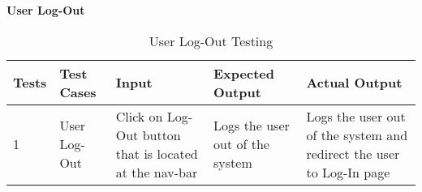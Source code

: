 \textbf{User Log-Out}\\
\begin{table}[H]
    \caption{User Log-Out Testing}
        \label{}
    \begin{tabular}{|p{0.3in}|p{1.3in}|p{1.3in}|p{1.3in}|p{1in}|}
        \hline
        Tests & Test Cases & Input &Expected Output & Actual Output \\
        \hline
            1 &User Log-Out & Click on Log-Out button that is located at the nav-bar &Logs the user out of the system &Logs the user out of the system and redirect the user to Log-In page \\
            \hline
\end{tabular}
\end{table}


